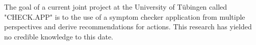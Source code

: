 The goal of a current joint project at the University of Tübingen called "CHECK.APP" is to the use of a symptom checker application from multiple perspectives and derive recommendations for actions. This research has yielded no credible knowledge to this date.









